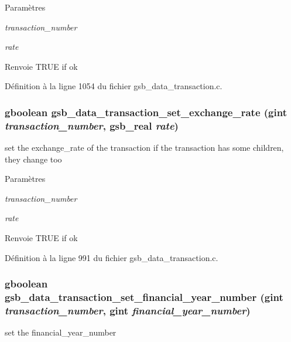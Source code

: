 \begin{DoxyParams}{Paramètres}
\item[{\em transaction\_\-number}]\item[{\em rate}]\end{DoxyParams}
\begin{DoxyReturn}{Renvoie}
TRUE if ok 
\end{DoxyReturn}


Définition à la ligne 1054 du fichier gsb\_\-data\_\-transaction.c.

\subsubsection[{gsb\_\-data\_\-transaction\_\-set\_\-exchange\_\-rate}]{\setlength{\rightskip}{0pt plus 5cm}gboolean gsb\_\-data\_\-transaction\_\-set\_\-exchange\_\-rate (gint {\em transaction\_\-number}, \/  {\bf gsb\_\-real} {\em rate})}\label{gsb__data__transaction_8c_ab820052bef3b75398e7a95f5ff25574d}
set the exchange\_\-rate of the transaction if the transaction has some children, they change too


\begin{DoxyParams}{Paramètres}
\item[{\em transaction\_\-number}]\item[{\em rate}]\end{DoxyParams}
\begin{DoxyReturn}{Renvoie}
TRUE if ok 
\end{DoxyReturn}


Définition à la ligne 991 du fichier gsb\_\-data\_\-transaction.c.

\subsubsection[{gsb\_\-data\_\-transaction\_\-set\_\-financial\_\-year\_\-number}]{\setlength{\rightskip}{0pt plus 5cm}gboolean gsb\_\-data\_\-transaction\_\-set\_\-financial\_\-year\_\-number (gint {\em transaction\_\-number}, \/  gint {\em financial\_\-year\_\-number})}\label{gsb__data__transaction_8c_a305e4bd347a0b42e2a5379b4c109d5b2}
set the financial\_\-year\_\-number


